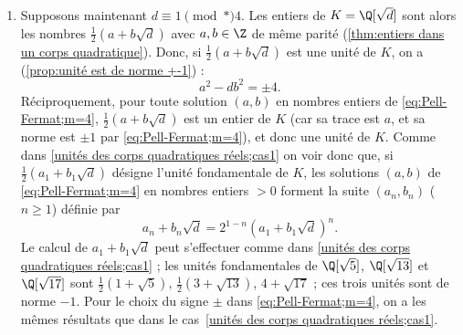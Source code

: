 \documentclass[11pt, useosf,
  title in boldface,
  theorem in new line,
  theorem numbering = section,
  number theorems separately,
]{simplivre}
\begin{document}
\begin{enumerate}
\begin{remark}
        \end{remark}
        \item \label{unités des corps quadratiques réels;cas2} Supposons maintenant \( d \equiv 1 \pmod*{4} \). Les entiers de \( K = \Q[\sqrt{d}] \) sont alors les nombres \( \frac{1}{2}(a+b\sqrt{d}) \) avec \( a,b \in \Z \) de même parité (\cref{thm:entiers dans un corps quadratique}). Donc, si \( \frac{1}{2}(a+b\sqrt{d}) \) est une unité de \( K \), on a (\cref{prop:unité est de norme +-1}) :
        \begin{equation}\label{eq:Pell-Fermat;m=4}
            a^2 - db^2 = \pm 4.
        \end{equation}
        Réciproquement, pour toute solution \( (a,b) \) en nombres entiers de \eqref{eq:Pell-Fermat;m=4}, \( \frac{1}{2}(a+b\sqrt{d}) \) est un entier de \( K \) (car sa trace est \( a \), et sa norme est \( \pm 1 \) par \eqref{eq:Pell-Fermat;m=4}), et donc une unité de \( K \). Comme dans \ref{unités des corps quadratiques réels;cas1} on voir donc que, si \( \frac{1}{2}(a_1+b_1\sqrt{d}) \) désigne l'unité fondamentale de \( K \), les solutions \( (a,b) \) de \eqref{eq:Pell-Fermat;m=4} en nombres entiers \( > 0 \) forment la suite \( (a_n, b_n) \) (\( n \geqslant 1 \)) définie par
        \begin{equation}
            a_n+b_n\sqrt{d} = 2^{1-n} (a_1+b_1\sqrt{d})^n.
        \end{equation}
        Le calcul de \( a_1+b_1\sqrt{d} \) peut s'effectuer comme dans \ref{unités des corps quadratiques réels;cas1} ; les unités fondamentales de \( \Q[\sqrt{5}] \), \( \Q[\sqrt{13}] \) et \( \Q[\sqrt{17}] \) sont \( \frac{1}{2}(1+\sqrt{5}) \), \( \frac{1}{2}(3+\sqrt{13}) \), \( 4+\sqrt{17} \) ; ces trois unités sont de norme \( -1 \). Pour le choix du signe \( \pm \) dans \eqref{eq:Pell-Fermat;m=4}, on a les mêmes résultats que dans le cas~\ref{unités des corps quadratiques réels;cas1}.

\end{enumerate}
\end{document}
